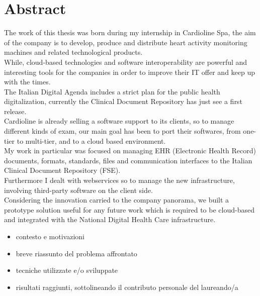 \chapter*{Abstract} %
\label{sommario}

The work of this thesis was born during my internship in Cardioline Spa, the aim of the company is to develop, produce and distribute heart activity monitoring machines and related technological products.\\While, cloud-based technologies and software interoperability are powerful and interesting tools for the companies in order to improve their IT offer and keep up with the times.\\The Italian Digital Agenda includes a strict plan for the public health digitalization, currently the Clinical Document Repository has just see a first release.\\Cardioline is already selling a software support to its clients, so to manage different kinds of exam, our main goal has been to port their softwares, from one-tier to multi-tier, and to a cloud based environment.\\My work in particular was focused on managing EHR (Electronic Health Record) documents, formats, standards, files and communication interfaces to the Italian Clinical Document Repository (FSE).\\Furthermore I dealt with webservices so to manage the new infrastructure, involving third-party software on the client side.\\Considering the innovation carried to the company panorama, we built a prototype solution useful for any future work which is required to be cloud-based and integrated with the National Digital Health Care infrastructure.
\begin{itemize}
  \item contesto e motivazioni 
  \item breve riassunto del problema affrontato
  \item tecniche utilizzate e/o sviluppate
  \item risultati raggiunti, sottolineando il contributo personale del laureando/a
\end{itemize}




